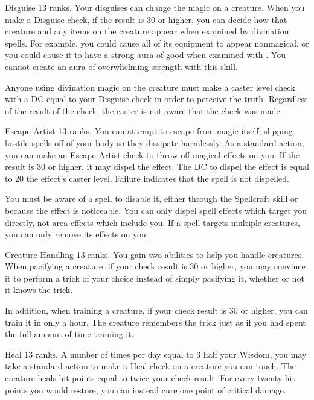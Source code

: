 \featpre Disguise 13 ranks.
\featben Your disguises can change the magic on a creature. When you make a Disguise check, if the result is 30 or higher, you can decide how that creature and any items on the creature appear when examined by divination spells. For example, you could cause all of its equipment to appear nonmagical, or you could cause it to have a strong aura of good when examined with . You cannot create an aura of overwhelming strength with this skill.

Anyone using divination magic on the creature must make a caster level check with a DC equal to your Disguise check in order to perceive the truth. Regardless of the result of the check, the caster is not aware that the check was made.

\featpre Escape Artist 13 ranks.
\featben You can attempt to escape from magic itself, slipping hostile spells off of your body so they dissipate harmlessly. As a standard action, you can make an Escape Artist check to throw off magical effects on you. If the result is 30 or higher, it may dispel the effect. The DC to dispel the effect is equal to 20 \add the effect's caster level. Failure indicates that the spell is not dispelled.

You must be aware of a spell to disable it, either through the Spellcraft skill or because the effect is noticeable. You can only dispel spell effects which target you directly, not area effects which include you. If a spell targets multiple creatures, you can only remove its effects on you.

\featpre Creature Handling 13 ranks.
\featben You gain two abilities to help you handle creatures. When pacifying a creature, if your check result is 30 or higher, you may convince it to perform a trick of your choice instead of simply pacifying it, whether or not it knows the trick.

In addition, when training a creature, if your check result is 30 or higher, you can train it in only a hour. The creature remembers the trick just as if you had spent the full amount of time training it.

\featpre Heal 13 ranks.
\featben A number of times per day equal to 3 \add half your Wisdom, you may take a standard action to make a Heal check on a creature you can touch. The creature heals hit points equal to twice your check result. For every twenty hit points you would restore, you can instead cure one point of critical damage.


